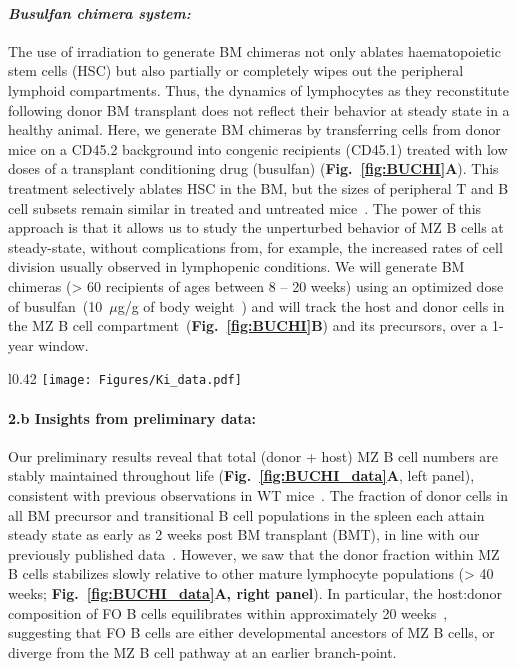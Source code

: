 \documentclass[11pt]{article}
\newcommand{\khi}{\ensuremath{\text{Ki67}^\text{hi}}~}
\newcommand{\para}[1]{\vspace*{-4.5mm}\paragraph{#1}}
\begin{document}
\para{\textit{Busulfan chimera system:}}
The use of irradiation to generate BM chimeras not only ablates haematopoietic stem cells (HSC) but also partially or completely wipes out the peripheral lymphoid compartments.
Thus, the dynamics of lymphocytes as they reconstitute following donor BM transplant does not reflect their behavior at steady state in a healthy animal.
Here, we generate BM chimeras by transferring cells from donor mice on a CD45.2 background into congenic recipients (CD45.1)  treated with low doses of a transplant conditioning drug (busulfan)  (\textbf{Fig.~\ref{fig:BUCHI}A}). 
This treatment selectively ablates HSC in the BM, but the sizes of peripheral T and B cell subsets remain similar in treated and untreated mice~\cite{Hogan_2019}. 
The power of this approach is that it allows us to study the unperturbed behavior of MZ B cells at steady-state, without complications from, for example, the increased rates of cell division usually observed in lymphopenic conditions.
We will generate BM chimeras (> 60 recipients of ages between 8 -- 20 weeks) using an optimized dose of busulfan~(10~$\mu$g/g of body weight~\cite{Hogan_2019}) and will track the host and donor cells in the MZ B cell compartment~(\textbf{Fig.~\ref{fig:BUCHI}B}) and its precursors, over a 1-year window.

\begin{wrapfigure}{l}{0.42\textwidth}
\centering
\vspace*{-4mm}
\texttt{[image: Figures/Ki\_data.pdf]}
\vspace*{-6mm}
\caption{
\textbf{(A)} Kinetics of total numbers and \textbf{(B)} normalized donor fraction of MZ B cells.
\textbf{(C)} Ki67 expression across B cell developmental stages. 
\textbf{(D)} Proportions of \khi cells within host and donor subsets in chimeras.}
\label{fig:BUCHI_data}
\vspace*{-6mm}
\end{wrapfigure}
\para{{2.b Insights from preliminary data:}}
Our preliminary results reveal that total (donor + host) MZ B cell numbers are stably maintained throughout life (\textbf{Fig.~\ref{fig:BUCHI_data}A}, left panel), consistent with previous observations in WT mice~\cite{Hao_2001, Carvalho_2001}.
The fraction of donor cells in all BM precursor and transitional B cell populations in the spleen each attain steady state as early as 2 weeks post BM transplant (BMT), in line with our previously published data~\cite{Verheijen_2020}. 
However, we saw that the donor fraction within MZ B cells stabilizes slowly relative to other mature lymphocyte populations (> 40 weeks; \textbf{Fig.~\ref{fig:BUCHI_data}A, right panel}).
In particular, the host:donor composition of FO B cells equilibrates within approximately 20 weeks~\cite{Verheijen_2020}, suggesting that FO B cells are either developmental ancestors of MZ B cells, or diverge from the MZ B cell pathway at an earlier branch-point.
\end{document}
